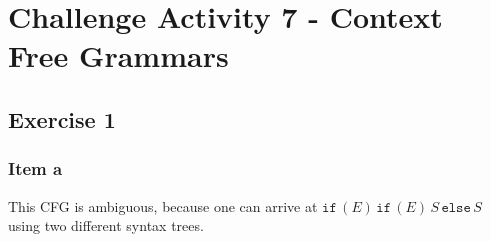 \setcounter{section}{6}
\section{Challenge Activity 7 - Context Free Grammars}
\subsection{Exercise 1}%
{
\renewcommand{\thesubsubsection}{\thesubsection\alph{subsubsection}}
\subsubsection{Item a}
This CFG is ambiguous, because one can arrive at $\mathtt{if}\,(E)\,\mathtt{if}\,(E)\,S\,\mathtt{else}\,S$ using two different syntax trees.
\begin{center}
\begin{minipage}{0.45\textwidth}
	\begin{center}
	\end{center}
\end{minipage}%
\begin{minipage}{0.40\textwidth}
	\begin{center}
	\end{center}
\end{minipage}
\end{center}
}
